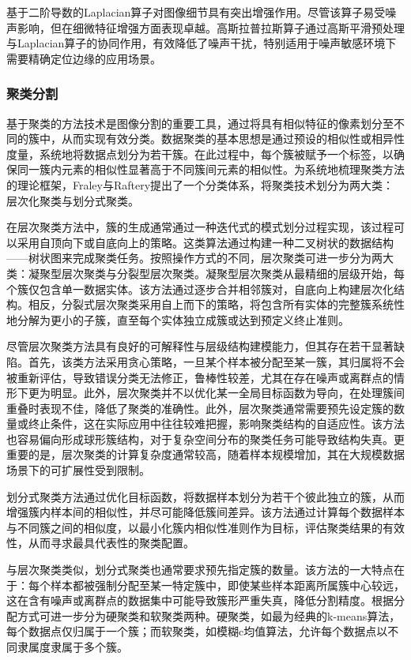 基于二阶导数的Laplacian算子对图像细节具有突出增强作用。尽管该算子易受噪声影响，但在细微特征增强方面表现卓越。高斯拉普拉斯算子通过高斯平滑预处理与Laplacian算子的协同作用，有效降低了噪声干扰，特别适用于噪声敏感环境下需要精确定位边缘的应用场景。

\subsubsection{聚类分割}

基于聚类的方法技术是图像分割的重要工具，通过将具有相似特征的像素划分至不同的簇中，从而实现有效分类。数据聚类的基本思想是通过预设的相似性或相异性度量，系统地将数据点划分为若干簇。在此过程中，每个簇被赋予一个标签，以确保同一簇内元素的相似性显著高于不同簇间元素的相似性。为系统地梳理聚类方法的理论框架，Fraley与Raftery提出了一个分类体系，将聚类技术划分为两大类：层次化聚类与划分式聚类。

在层次聚类方法中，簇的生成通常通过一种迭代式的模式划分过程实现，该过程可以采用自顶向下或自底向上的策略。这类算法通过构建一种二叉树状的数据结构——树状图来完成聚类任务。按照操作方式的不同，层次聚类可进一步分为两大类：凝聚型层次聚类与分裂型层次聚类。凝聚型层次聚类从最精细的层级开始，每个簇仅包含单一数据实体。该方法通过逐步合并相邻簇对，自底向上构建层次化结构。相反，分裂式层次聚类采用自上而下的策略，将包含所有实体的完整簇系统性地分解为更小的子簇，直至每个实体独立成簇或达到预定义终止准则。

尽管层次聚类方法具有良好的可解释性与层级结构建模能力，但其存在若干显著缺陷。首先，该类方法采用贪心策略，一旦某个样本被分配至某一簇，其归属将不会被重新评估，导致错误分类无法修正，鲁棒性较差，尤其在存在噪声或离群点的情形下更为明显。此外，层次聚类并不以优化某一全局目标函数为导向，在处理簇间重叠时表现不佳，降低了聚类的准确性。此外，层次聚类通常需要预先设定簇的数量或终止条件，这在实际应用中往往较难把握，影响聚类结构的自适应性。该方法也容易偏向形成球形簇结构，对于复杂空间分布的聚类任务可能导致结构失真。更重要的是，层次聚类的计算复杂度通常较高，随着样本规模增加，其在大规模数据场景下的可扩展性受到限制。

划分式聚类方法通过优化目标函数，将数据样本划分为若干个彼此独立的簇，从而增强簇内样本间的相似性，并尽可能降低簇间差异。该方法通过计算每个数据样本与不同簇之间的相似度，以最小化簇内相似性准则作为目标，评估聚类结果的有效性，从而寻求最具代表性的聚类配置。

与层次聚类类似，划分式聚类也通常要求预先指定簇的数量。该方法的一大特点在于：每个样本都被强制分配至某一特定簇中，即使某些样本距离所属簇中心较远，这在含有噪声或离群点的数据集中可能导致簇形严重失真，降低分割精度。根据分配方式可进一步分为硬聚类和软聚类两种。硬聚类，如最为经典的k-means算法，每个数据点仅归属于一个簇；而软聚类，如模糊c均值算法，允许每个数据点以不同隶属度隶属于多个簇。

